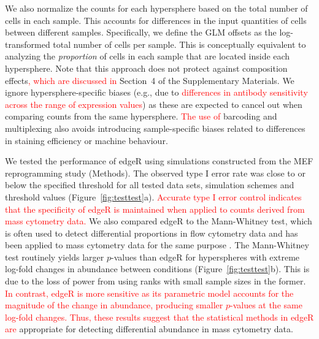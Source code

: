 \documentclass{article}
\newcommand\revised[1]{\textcolor{red}{#1}}
\newcommand{\suppcomponorm}{4}
\begin{document}
We also normalize the counts for each hypersphere based on the total number of cells in each sample.
This accounts for differences in the input quantities of cells between different samples.
Specifically, we define the GLM offsets as the log-transformed total number of cells per sample.
This is conceptually equivalent to analyzing the \textit{proportion} of cells in each sample that are located inside each hypersphere.
Note that this approach does not protect against composition effects\revised{, which are discussed in} Section~\suppcomponorm{} of the Supplementary Materials.
We ignore hypersphere-specific biases (e.g., due to \revised{differences in antibody sensitivity across the range of expression values}) as these are expected to cancel out when comparing counts from the same hypersphere.
\revised{The use of} barcoding and multiplexing also avoids introducing sample-specific biases related to differences in staining efficiency or machine behaviour.

We tested the performance of edgeR using simulations constructed from the MEF reprogramming study (Methods).
The observed type I error rate was close to or below the specified threshold for all tested data sets, simulation schemes and threshold values (Figure~\ref{fig:testtest}a).
\revised{Accurate type I error control indicates that the specificity of edgeR is maintained when applied to counts derived from mass cytometry data.}
We also compared edgeR to the Mann-Whitney test, which is often used to detect differential proportions in flow cytometry data \cite{watson1992significance} and has been applied to mass cytometry data for the same purpose \cite{behbehani2015mass}.
The Mann-Whitney test routinely yields larger $p$-values than edgeR for hyperspheres with extreme log-fold changes in abundance between conditions (Figure~\ref{fig:testtest}b).
This is due to the loss of power from using ranks with small sample sizes in the former.
\revised{In contrast, edgeR is more sensitive as its parametric model accounts for the magnitude of the change in abundance, producing smaller $p$-values at the same log-fold changes.
Thus, these results suggest that the statistical methods in edgeR are} appropriate for detecting differential abundance in mass cytometry data.
\end{document}
